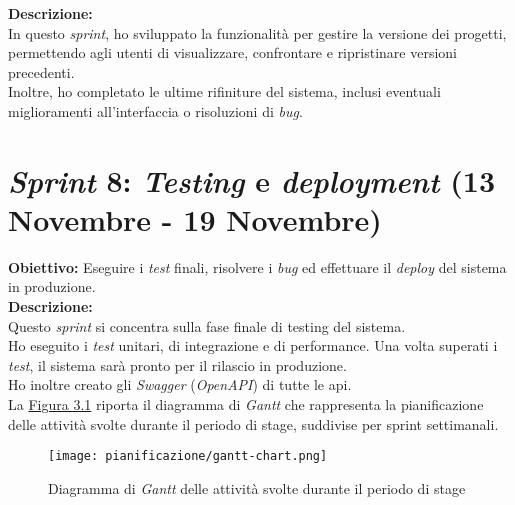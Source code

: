 \noindent \textbf{Descrizione:}\\
\noindent In questo \textit{sprint}, ho sviluppato la funzionalità per gestire la versione dei progetti, permettendo agli utenti di visualizzare, confrontare e ripristinare versioni precedenti.\\
Inoltre, ho completato le ultime rifiniture del sistema, inclusi eventuali miglioramenti all'interfaccia o risoluzioni di \textit{bug}.\\
\pagebreak
\section*{\textit{Sprint} 8: \textit{Testing} e \textit{deployment} (13 Novembre - 19 Novembre)}
\textbf{Obiettivo:} Eseguire i \textit{test} finali, risolvere i \textit{bug} ed effettuare il \textit{deploy} del sistema in produzione.\\

\noindent \textbf{Descrizione:}\\
\noindent Questo \textit{sprint} si concentra sulla fase finale di testing del sistema.\\
Ho eseguito i \textit{test} unitari, di integrazione e di performance. Una volta superati i \textit{test}, il sistema sarà pronto per il rilascio in produzione. \\
Ho inoltre creato gli \textit{Swagger} (\textit{OpenAPI}) di tutte le \gls{api}.\\

\noindent La {\hyperref[fig:gantt-chart]{Figura 3.1}} riporta il diagramma di \textit{Gantt} che rappresenta la pianificazione delle attività svolte durante il periodo di stage, suddivise per \gls{sprint} settimanali.\\

\begin{figure}[H]
    \centering
    \texttt{[image: pianificazione/gantt-chart.png]}
    \caption{Diagramma di \textit{Gantt} delle attività svolte durante il periodo di stage}
    \label{fig:gantt-chart}
\end{figure}